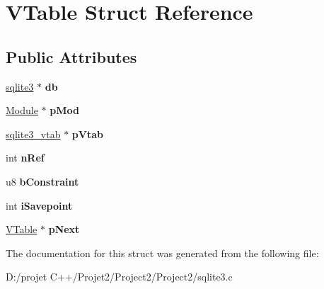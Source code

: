 \hypertarget{struct_v_table}{}\section{V\+Table Struct Reference}
\label{struct_v_table}
\subsection*{Public Attributes}
\begin{DoxyCompactItemize}
\item 
\mbox{\label{struct_v_table_a855b43c118d693910e9060cc9d9ac91a}} 
\mbox{\hyperlink{structsqlite3}{sqlite3}} $\ast$ {\bfseries db}
\item 
\mbox{\label{struct_v_table_ae444452a7168e2f4224a75768abe8312}} 
\mbox{\hyperlink{struct_module}{Module}} $\ast$ {\bfseries p\+Mod}
\item 
\mbox{\label{struct_v_table_ae15b9cb002c013019dcbac919bda9ac8}} 
\mbox{\hyperlink{structsqlite3__vtab}{sqlite3\+\_\+vtab}} $\ast$ {\bfseries p\+Vtab}
\item 
\mbox{\label{struct_v_table_a12ffe156e5e8e7d19ed029ccfe4ab5dc}} 
int {\bfseries n\+Ref}
\item 
\mbox{\label{struct_v_table_a5a970416a76dbe3be500c9458c89550d}} 
u8 {\bfseries b\+Constraint}
\item 
\mbox{\label{struct_v_table_a19f1c6c5f5fedabba7e605bbe15358e4}} 
int {\bfseries i\+Savepoint}
\item 
\mbox{\label{struct_v_table_af3cac5e5a38508d0111acb9aa6c5f435}} 
\mbox{\hyperlink{struct_v_table}{V\+Table}} $\ast$ {\bfseries p\+Next}
\end{DoxyCompactItemize}


The documentation for this struct was generated from the following file\+:\begin{DoxyCompactItemize}
\item 
D\+:/projet C++/\+Projet2/\+Project2/\+Project2/sqlite3.\+c\end{DoxyCompactItemize}
